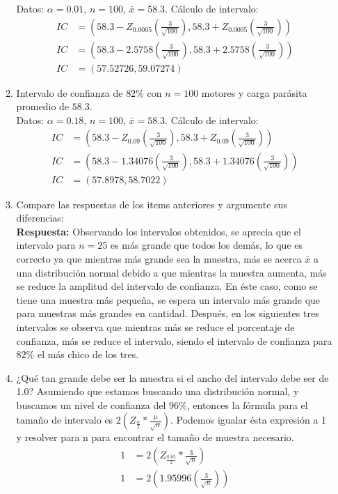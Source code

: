 \documentclass[12pt, letterpaper]{report}
\begin{document}
\begin{enumerate}
\begin{enumerate}
Datos: $\alpha = 0.01$, $n = 100$, $\bar{x} = 58.3$. Cálculo de intervalo: 
\begin{align*}
    IC &= (58.3 - Z_{0.0005}(\frac{3}{\sqrt{100}}), 58.3 +  Z_{0.0005}(\frac{3}{\sqrt{100}}))\\ 
    IC &= (58.3 - 2.5758(\frac{3}{\sqrt{100}}), 58.3 +  2.5758(\frac{3}{\sqrt{100}}))\\
    IC &= (57.52726, 59.07274)
\end{align*}
\item Intervalo de confianza de $82$\% con $n = 100$ motores y carga parásita promedio de $58.3$. \\
Datos: $\alpha = 0.18$, $n = 100$, $\bar{x} = 58.3$. Cálculo de intervalo: 
\begin{align*}
    IC &= (58.3 - Z_{0.09}(\frac{3}{\sqrt{100}}), 58.3 +  Z_{0.09}(\frac{3}{\sqrt{100}}))\\ 
    IC &= (58.3 - 1.34076(\frac{3}{\sqrt{100}}), 58.3 +  1.34076(\frac{3}{\sqrt{100}}))\\
    IC &= (57.8978, 58.7022)
\end{align*}
\item Compare las respuestas de los items anteriores y argumente sus diferencias: \\ 
\textbf{Respuesta: } Observando los intervalos obtenidos, se aprecia que el intervalo para $n = 25$ es más grande que todos los 
demás, lo que es correcto ya que mientras más grande sea la muestra, más se acerca $\bar{x}$ a una distribución normal debido a que 
mientras la muestra aumenta, más se reduce la amplitud del intervalo de confianza. En éste caso, como se tiene una muestra más pequeña, 
se espera un intervalo más grande que para muestras más grandes en cantidad. Después, en los siguientes 
tres intervalos se observa que mientras más se reduce el porcentaje de confianza, más se reduce el intervalo, siendo el intervalo de confianza 
para $82$\% el más chico de los tres. 
\item ¿Qué tan grande debe ser la muestra si el ancho del intervalo debe ser de 1.0?
Asumiendo que estamos buscando una distribución normal, y buscamos un nivel de confianza del $96$\%, entonces 
la fórmula para el tamaño de intervalo es $2(Z_{\frac{\alpha}{2}}\ast \frac{\mu}{\sqrt{n}})$. Podemos igualar ésta expresión a 1 y resolver para n para 
encontrar el tamaño de muestra necesario. 
\begin{align*}
    1 &= 2(Z_{\frac{0.05}{2}}\ast \frac{3}{\sqrt{n}})\\
    1 &= 2(1.95996(\frac{3}{\sqrt{n}}))\\

\end{align*}
\end{enumerate}
\end{enumerate}
\end{document}
